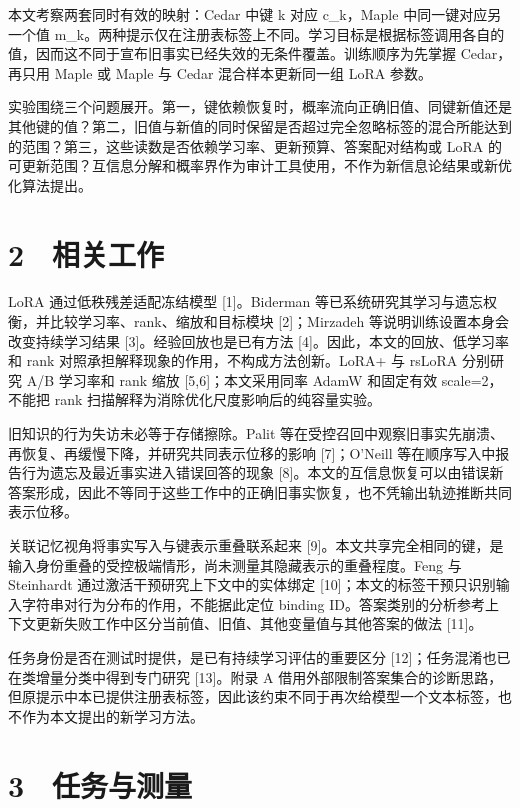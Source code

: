 \documentclass[UTF8,fontset=fandol,10pt,a4paper]{ctexart}
\begin{document}
本文考察两套同时有效的映射：Cedar 中键 k 对应 c\_k，Maple 中同一键对应另一个值 m\_k。两种提示仅在注册表标签上不同。学习目标是根据标签调用各自的值，因而这不同于宣布旧事实已经失效的无条件覆盖。训练顺序为先掌握 Cedar，再只用 Maple 或 Maple 与 Cedar 混合样本更新同一组 LoRA 参数。



实验围绕三个问题展开。第一，键依赖恢复时，概率流向正确旧值、同键新值还是其他键的值？第二，旧值与新值的同时保留是否超过完全忽略标签的混合所能达到的范围？第三，这些读数是否依赖学习率、更新预算、答案配对结构或 LoRA 的可更新范围？互信息分解和概率界作为审计工具使用，不作为新信息论结果或新优化算法提出。



\section*{2　相关工作}
LoRA 通过低秩残差适配冻结模型 [1]。Biderman 等已系统研究其学习与遗忘权衡，并比较学习率、rank、缩放和目标模块 [2]；Mirzadeh 等说明训练设置本身会改变持续学习结果 [3]。经验回放也是已有方法 [4]。因此，本文的回放、低学习率和 rank 对照承担解释现象的作用，不构成方法创新。LoRA+ 与 rsLoRA 分别研究 A/B 学习率和 rank 缩放 [5,6]；本文采用同率 AdamW 和固定有效 scale=2，不能把 rank 扫描解释为消除优化尺度影响后的纯容量实验。



旧知识的行为失访未必等于存储擦除。Palit 等在受控召回中观察旧事实先崩溃、再恢复、再缓慢下降，并研究共同表示位移的影响 [7]；O'Neill 等在顺序写入中报告行为遗忘及最近事实进入错误回答的现象 [8]。本文的互信息恢复可以由错误新答案形成，因此不等同于这些工作中的正确旧事实恢复，也不凭输出轨迹推断共同表示位移。



关联记忆视角将事实写入与键表示重叠联系起来 [9]。本文共享完全相同的键，是输入身份重叠的受控极端情形，尚未测量其隐藏表示的重叠程度。Feng 与 Steinhardt 通过激活干预研究上下文中的实体绑定 [10]；本文的标签干预只识别输入字符串对行为分布的作用，不能据此定位 binding ID。答案类别的分析参考上下文更新失败工作中区分当前值、旧值、其他变量值与其他答案的做法 [11]。



任务身份是否在测试时提供，是已有持续学习评估的重要区分 [12]；任务混淆也已在类增量分类中得到专门研究 [13]。附录 A 借用外部限制答案集合的诊断思路，但原提示中本已提供注册表标签，因此该约束不同于再次给模型一个文本标签，也不作为本文提出的新学习方法。



\section*{3　任务与测量}
\end{document}
